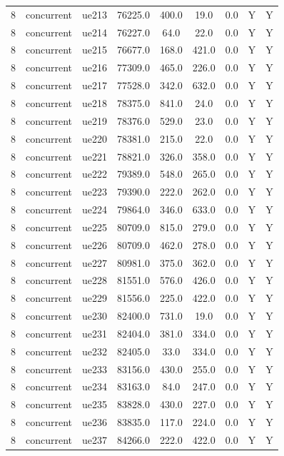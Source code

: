 \begin{table}[ht]
\begin{tabular}{|c|c|c|c|c|c|c|c|c|}
8 & concurrent & ue213 & 76225.0 & 400.0 & 19.0 & 0.0 & Y & Y \\
8 & concurrent & ue214 & 76227.0 & 64.0 & 22.0 & 0.0 & Y & Y \\
8 & concurrent & ue215 & 76677.0 & 168.0 & 421.0 & 0.0 & Y & Y \\
8 & concurrent & ue216 & 77309.0 & 465.0 & 226.0 & 0.0 & Y & Y \\
8 & concurrent & ue217 & 77528.0 & 342.0 & 632.0 & 0.0 & Y & Y \\
8 & concurrent & ue218 & 78375.0 & 841.0 & 24.0 & 0.0 & Y & Y \\
8 & concurrent & ue219 & 78376.0 & 529.0 & 23.0 & 0.0 & Y & Y \\
8 & concurrent & ue220 & 78381.0 & 215.0 & 22.0 & 0.0 & Y & Y \\
8 & concurrent & ue221 & 78821.0 & 326.0 & 358.0 & 0.0 & Y & Y \\
8 & concurrent & ue222 & 79389.0 & 548.0 & 265.0 & 0.0 & Y & Y \\
8 & concurrent & ue223 & 79390.0 & 222.0 & 262.0 & 0.0 & Y & Y \\
8 & concurrent & ue224 & 79864.0 & 346.0 & 633.0 & 0.0 & Y & Y \\
8 & concurrent & ue225 & 80709.0 & 815.0 & 279.0 & 0.0 & Y & Y \\
8 & concurrent & ue226 & 80709.0 & 462.0 & 278.0 & 0.0 & Y & Y \\
8 & concurrent & ue227 & 80981.0 & 375.0 & 362.0 & 0.0 & Y & Y \\
8 & concurrent & ue228 & 81551.0 & 576.0 & 426.0 & 0.0 & Y & Y \\
8 & concurrent & ue229 & 81556.0 & 225.0 & 422.0 & 0.0 & Y & Y \\
8 & concurrent & ue230 & 82400.0 & 731.0 & 19.0 & 0.0 & Y & Y \\
8 & concurrent & ue231 & 82404.0 & 381.0 & 334.0 & 0.0 & Y & Y \\
8 & concurrent & ue232 & 82405.0 & 33.0 & 334.0 & 0.0 & Y & Y \\
8 & concurrent & ue233 & 83156.0 & 430.0 & 255.0 & 0.0 & Y & Y \\
8 & concurrent & ue234 & 83163.0 & 84.0 & 247.0 & 0.0 & Y & Y \\
8 & concurrent & ue235 & 83828.0 & 430.0 & 227.0 & 0.0 & Y & Y \\
8 & concurrent & ue236 & 83835.0 & 117.0 & 224.0 & 0.0 & Y & Y \\
8 & concurrent & ue237 & 84266.0 & 222.0 & 422.0 & 0.0 & Y & Y \\

\end{tabular}
\end{table}
